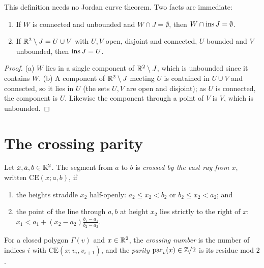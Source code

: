 
This definition needs no Jordan curve theorem. Two facts are immediate:

\begin{lemma}\label{lem:ins-basic}
\leavevmode
\begin{enumerate}[label=(\alph*)]
\item If $W$ is connected and unbounded and $W\cap J=\emptyset$, then $W\cap\operatorname{ins} J=\emptyset$.
\item If $\mathbb{R}^2\setminus J=U\cup V$ with $U,V$ open, disjoint and connected, $U$ bounded and $V$
unbounded, then $\operatorname{ins} J=U$.
\end{enumerate}
\end{lemma}

\begin{proof}
(a) $W$ lies in a single component of $\mathbb{R}^2\setminus J$, which is unbounded since it contains $W$.
(b) A component of $\mathbb{R}^2\setminus J$ meeting $U$ is contained in $U\cup V$ and connected, so it lies in
$U$ (the sets $U,V$ are open and disjoint); as $U$ is connected, the component is $U$. Likewise the
component through a point of $V$ is $V$, which is unbounded.
\end{proof}


\section{The crossing parity}

\begin{definition}\label{def:crosses}
Let $x,a,b\in\mathbb{R}^2$. The segment from $a$ to $b$ is \emph{crossed by the east ray from $x$}, written
$\mathrm{CE}(x;a,b)$, if
\begin{enumerate}[label=(\roman*)]
\item the heights straddle $x_2$ half-openly: $a_2\le x_2<b_2$ or $b_2\le x_2<a_2$; and
\item the point of the line through $a,b$ at height $x_2$ lies strictly to the right of $x$:
$x_1<a_1+(x_2-a_2)\frac{b_1-a_1}{b_2-a_2}$.
\end{enumerate}
For a closed polygon $\Gamma(v)$ and $x\in\mathbb{R}^2$, the \emph{crossing number} is the number of
indices $i$ with $\mathrm{CE}(x;v_i,v_{i+1})$, and the \emph{parity} $\operatorname{par}_v(x)\in\mathbb{Z}/2$ is its
residue mod $2$.
\end{definition}


